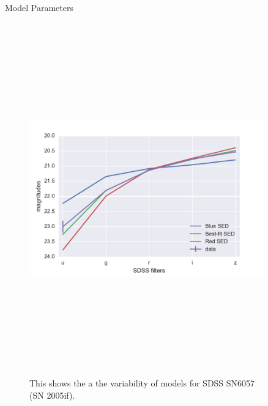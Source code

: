 \documentclass[final]{beamer}
\newlength{\sepwid}
\newlength{\onecolwid}
\newlength{\twocolwid}
\begin{document}
\begin{frame}[t]
\begin{columns}[t]
\begin{column}{\twocolwid}
\begin{columns}
\begin{column}{\onecolwid}
\begin{block}{Model Parameters}
\begin{figure}
    \includegraphics[height=6in]{SN6057-Model-Variability.pdf}
    \caption{This shows the a the variability of models for SDSS SN6057 (SN 2005if).}
    \label{fig:diverse}
\end{figure}

\end{block}
\end{column}

\begin{column}{\sepwid}\end{column}\label{centerspace}

\end{columns}


\end{column}
\end{columns}
\end{frame}
\end{document}
